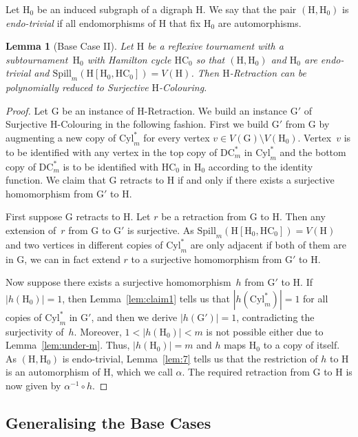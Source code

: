\documentclass[a4paper,12pt]{article}
\newtheorem{lemma}{Lemma}
\theoremstyle{remark}
\newcommand{\HC}[0]{\ensuremath{\mathrm{HC}}}
\newcommand{\DCm}[0]{\ensuremath{\mathrm{DC}^*_m}}
\newcommand{\Cylm}[0]{\ensuremath{\mathrm{Cyl}^*_m}}
\newcommand{\G}{\ensuremath{\mathrm{G}}}
\renewcommand{\H}{\ensuremath{\mathrm{H}}}
\begin{document}
Let $\H_0$ be an induced subgraph of a digraph $\H$. We say that the pair $(\H,\H_0)$ is \emph{endo-trivial} if all endomorphisms of $\H$ that fix $\H_0$ are automorphisms.

\begin{lemma}[Base Case II]
Let $\H$ be a reflexive tournament with a subtournament~$\H_0$ with Hamilton cycle $\HC_0$ so that $(\H,\H_0)$ and $\H_0$ are endo-trivial and $\mathrm{Spill}_m(\H[\H_0,\HC_0]) = V(\H)$. 
Then $\H$-{\sc Retraction} can be polynomially reduced to {\sc Surjective $\H$-Colouring}.
\label{prop:main2}
\end{lemma}
\begin{proof}
Let $\G$ be an instance of {\sc $\H$-Retraction}. 
We build an instance $\G'$ of {\sc Surjective $\H$-Colouring}
in the following fashion. First we build $\G'$ from $\G$ by augmenting a new copy of $\Cylm$ for every vertex $v \in V(\G) \setminus V(\H_0)$. Vertex~$v$ is to be identified with any vertex in the top copy of $\DCm$ in $\Cylm$ and the bottom copy of $\DCm$ is to be identified with $\HC_0$ in $\H_0$ according to the identity function. We claim that $\G$ retracts to $\H$ if and only if there exists a surjective homomorphism from $\G'$ to $\H$.

First suppose $\G$ retracts to $\H$. Let $r$ be a retraction from $\G$ to $\H$. Then any extension of~$r$ from $\G$ to $\G'$ is surjective. As $\mathrm{Spill}_m(\H[\H_0,\HC_0]) = V(\H)$ and two vertices in different copies of $\Cylm$ are only adjacent if both of them are in $\G$, we can in fact extend $r$ to a surjective homomorphism from $\G'$ to $\H$.

Now suppose there exists a surjective homomorphism~$h$ from $\G'$ to $\H$.
If $|h(\H_0)|=1$, then Lemma~\ref{lem:claim1} tells us that  $|h(\Cylm)|=1$ for all copies of $\Cylm$ in $\G'$, and then we derive $|h(\G')|=1$, contradicting the surjectivity of~$h$.
Moreover, $1<|h(\H_0)|<m$ is not possible either due to Lemma~\ref{lem:under-m}. Thus, $|h(\H_0)|=m$ and $h$ maps $\H_0$ to a copy of itself. 
As $(\H,\H_0)$ is endo-trivial, Lemma~\ref{lem:7} tells us that  the restriction of $h$ to $\H$ 
is an automorphism of $\H$, which we call $\alpha$. The required retraction from $\G$ to $\H$ is now given by $\alpha^{-1} \circ h$.
\end{proof}

\subsection{Generalising the Base Cases}\label{s-general}
\end{document}
